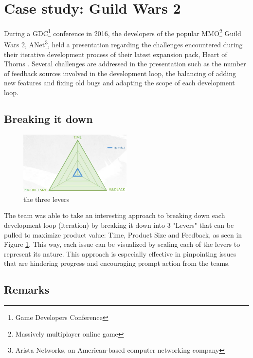 \documentclass{scrartcl}
\begin{document}
    \section{Case study: Guild Wars 2}
    
    During a GDC\footnote{Game Developers Conference} conference in 2016, the developers of the popular MMO\footnote{Massively multiplayer online game} Guild Wars 2, ANet\footnote{Arista Networks, an American-based computer networking company}, held a presentation regarding the challenges encountered during their iterative development process of their latest expansion pack, Heart of Thorns \cite{GW2}. Several challenges are addressed in the presentation such as the number of feedback sources involved in the development loop\cite{AgileManifesto}, the balancing of adding new features and fixing old bugs and adapting the scope of each development loop.
    
    \subsection{Breaking it down}
    
    \begin{figure}
        \centering
        \includegraphics[width=0.5\textwidth]{Loop.jpg}
        \caption{the three levers}
        \label{fig:loop}
    \end{figure}
    
    The team was able to take an interesting approach to breaking down each development loop (iteration) by breaking it down into 3 "Levers"\cite{GW2} that can be pulled to maximize product value: Time, Product Size and Feedback, as seen in Figure \ref{fig:loop}. This way, each issue can be visualized by scaling each of the levers to represent its nature. This approach is especially effective in pinpointing issues that are hindering progress and encouraging prompt action from the teams.
    
    \subsection{Remarks}
    
\end{document}
